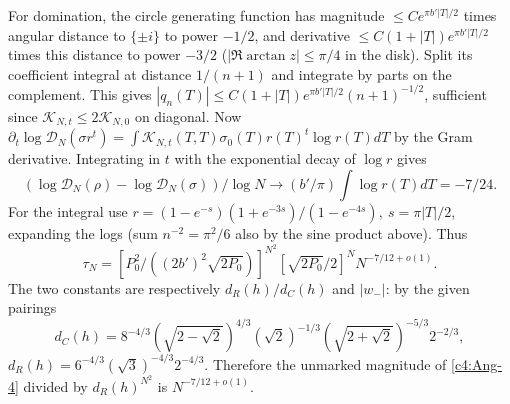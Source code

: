 For domination, the circle generating function has magnitude \(\le C e^{\pi b' |T|/2}\) times angular distance to \(\{\pm i\}\) to power \(-1/2\), and derivative \(\le C(1+|T|) e^{\pi b'|T|/2}\) times this distance to power \(-3/2\) (\(|\Re\arctan z|\le\pi/4\) in the disk). Split its coefficient integral at distance \(1/(n+1)\) and integrate by parts on the complement. This gives \(|q_n(T)|\le C(1+|T|)e^{\pi b'|T|/2}(n+1)^{-1/2}\), sufficient since \(\mathcal K_{N,t}\le2\mathcal K_{N,0}\) on diagonal. Now \(\partial_t\log\mathcal D_N(\sigma r^t)=\int \mathcal K_{N,t}(T,T)\sigma_0(T)r(T)^t\log r(T)dT\) by the Gram derivative. Integrating in \(t\) with the exponential decay of \(\log r\) gives
\[
 (\log\mathcal D_N(\rho)-\log\mathcal D_N(\sigma))/\log N
       \longrightarrow (b'/\pi)\int\log r(T)dT=-7/24.
\]
For the integral use \(r=(1-e^{-s})(1+e^{-3s})/(1-e^{-4s}),\ s=\pi|T|/2\), expanding the logs (sum \(n^{-2}=\pi^2/6\) also by the sine product above). Thus
\[
 \tau_N=[P_0^2/((2b')^2\sqrt{2P_0})]^{N^2}[\sqrt{2P_0}/2]^N N^{-7/12+o(1)}.
\]
The two constants are respectively \(d_R(h)/d_C(h)\) and \(|w_-|\): by the given pairings 
\[d_C(h)=8^{-4/3}(\sqrt{2-\sqrt2})^{4/3}(\sqrt2)^{-1/3}(\sqrt{2+\sqrt2})^{-5/3}2^{-2/3},\]
\(d_R(h)=6^{-4/3}(\sqrt3)^{-4/3}2^{-4/3}\). Therefore the unmarked magnitude of \eqref{c4:Ang-4} divided by \(d_R(h)^{N^2}\) is \(N^{-7/12+o(1)}\).

